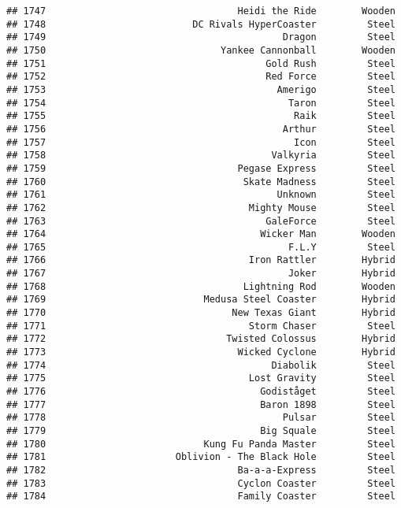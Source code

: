 \documentclass[
]{article}
\begin{document}
\begin{verbatim}
## 1747                                  Heidi the Ride        Wooden
## 1748                          DC Rivals HyperCoaster         Steel
## 1749                                          Dragon         Steel
## 1750                               Yankee Cannonball        Wooden
## 1751                                       Gold Rush         Steel
## 1752                                       Red Force         Steel
## 1753                                         Amerigo         Steel
## 1754                                           Taron         Steel
## 1755                                            Raik         Steel
## 1756                                          Arthur         Steel
## 1757                                            Icon         Steel
## 1758                                        Valkyria         Steel
## 1759                                  Pegase Express         Steel
## 1760                                   Skate Madness         Steel
## 1761                                         Unknown         Steel
## 1762                                    Mighty Mouse         Steel
## 1763                                       GaleForce         Steel
## 1764                                      Wicker Man        Wooden
## 1765                                           F.L.Y         Steel
## 1766                                    Iron Rattler        Hybrid
## 1767                                           Joker        Hybrid
## 1768                                   Lightning Rod        Wooden
## 1769                            Medusa Steel Coaster        Hybrid
## 1770                                 New Texas Giant        Hybrid
## 1771                                    Storm Chaser         Steel
## 1772                                Twisted Colossus        Hybrid
## 1773                                  Wicked Cyclone        Hybrid
## 1774                                        Diabolik         Steel
## 1775                                    Lost Gravity         Steel
## 1776                                      Godiståget         Steel
## 1777                                      Baron 1898         Steel
## 1778                                          Pulsar         Steel
## 1779                                      Big Squale         Steel
## 1780                            Kung Fu Panda Master         Steel
## 1781                       Oblivion - The Black Hole         Steel
## 1782                                  Ba-a-a-Express         Steel
## 1783                                  Cyclon Coaster         Steel
## 1784                                  Family Coaster         Steel

\end{verbatim}
\end{document}

